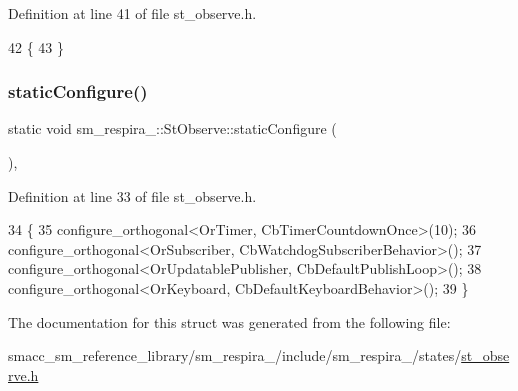 Definition at line 41 of file st\+\_\+observe.\+h.


\begin{DoxyCode}
42     \{
43     \}
\end{DoxyCode}
\mbox{\label{structsm__respira__1_1_1StObserve_aebbcdfd15dd19f49629e7bb21ff4624c}} 
\subsubsection{\texorpdfstring{static\+Configure()}{staticConfigure()}}
{\footnotesize\ttfamily static void sm\+\_\+respira\+\_\+::\+St\+Observe\+::static\+Configure (\begin{DoxyParamCaption}{ }\end{DoxyParamCaption})\hspace{0.3cm}{\ttfamily [inline]}, {\ttfamily [static]}}



Definition at line 33 of file st\+\_\+observe.\+h.


\begin{DoxyCode}
34     \{
35         configure\_orthogonal<OrTimer, CbTimerCountdownOnce>(10);
36         configure\_orthogonal<OrSubscriber, CbWatchdogSubscriberBehavior>();
37         configure\_orthogonal<OrUpdatablePublisher, CbDefaultPublishLoop>();
38         configure\_orthogonal<OrKeyboard, CbDefaultKeyboardBehavior>();
39     \}
\end{DoxyCode}


The documentation for this struct was generated from the following file\+:\begin{DoxyCompactItemize}
\item 
smacc\+\_\+sm\+\_\+reference\+\_\+library/sm\+\_\+respira\+\_/include/sm\+\_\+respira\+\_/states/\hyperlink{sm__respira__1_2include_2sm__respira__1_2states_2st__observe_8h}{st\+\_\+observe.\+h}\end{DoxyCompactItemize}
